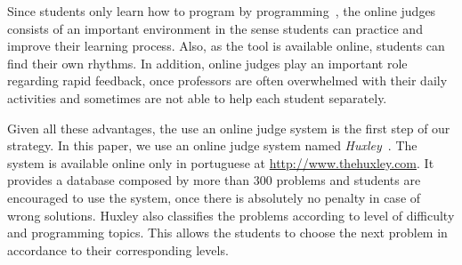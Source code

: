 Since students only learn how to program by programming~\cite{jenkins-ltsn02}, the online judges consists of an important environment in the sense students can practice and improve their learning process. Also, as the tool is available online, students can find their own rhythms. In addition, online judges play an important role regarding rapid feedback, once professors are often overwhelmed with their daily activities and sometimes are not able to help each student separately.


Given all these advantages, the use an online judge system is the first step of our strategy. In this paper, we use an online judge system named \textit{Huxley}~\cite{paes2013ferramenta}. The system is available online only in portuguese at \url{http://www.thehuxley.com}. It provides a database composed by more than 300 problems and students are encouraged to use the system, once there is absolutely no penalty in case of wrong solutions. Huxley also classifies the problems according to level of difficulty and programming topics. This allows the students to choose the next problem in accordance to their corresponding levels.





